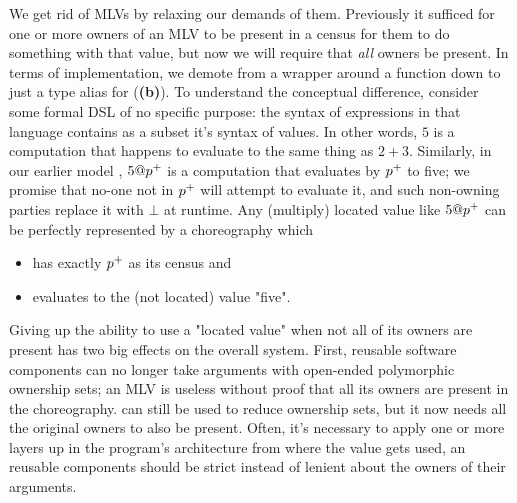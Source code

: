 We get rid of MLVs by relaxing our demands of them.
Previously it sufficed for one or more owners of an MLV to be present in a census for them to do something with that value,
but now we will require that \emph{all} owners be present.
In terms of implementation,
we demote  from a  wrapper around a function down to just a type alias for 
(\textbf{(b)}).
To understand the conceptual difference,
consider some formal DSL of no specific purpose:
the syntax of expressions in that language contains as a subset it's syntax of values.
In other words, $5$ is a computation that happens to evaluate to the same thing as $2+3$.
Similarly, in our earlier model \HLSCentral, $5@{p^{+}}$ is a computation that evaluates by ${p^{+}}$ to five;
we promise that no-one not in ${p^{+}}$ will attempt to evaluate it, and such non-owning parties replace it with $\bot$ at runtime.
Any (multiply) located value like $5@{p^{+}}$ can be perfectly represented by a choreography which
\begin{itemize}
	\item has exactly ${p^{+}}$ as its census and
	\item evaluates to the (not located) value "five".
\end{itemize}

Giving up the ability to use a "located value" when not all of its owners are present has two big effects on the overall system.
First, reusable software components can no longer take arguments with open-ended polymorphic ownership sets;
an MLV is useless without proof that all its owners are present in the choreography.
 can still be used to reduce ownership sets, but it now needs all the original owners to also be present.
Often, it's necessary to apply  one or more layers up in the program's architecture from where the value gets used,
an reusable components should be strict instead of lenient about the owners of their arguments.

